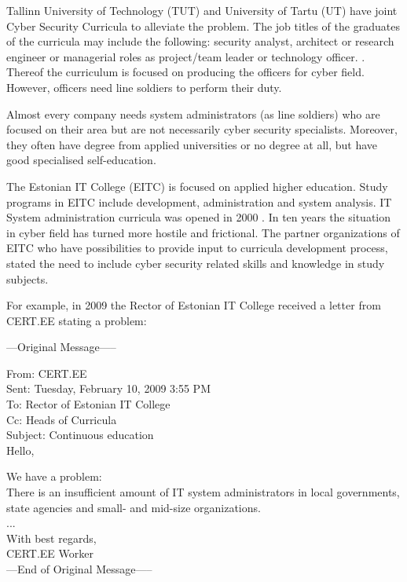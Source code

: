 Tallinn University of Technology (\gls{TUT}) and University of Tartu (\gls{UT}) have joint Cyber Security Curricula to alleviate the problem. The job titles of the graduates of the curricula may include the following: security analyst, architect or research engineer or managerial roles as project/team leader or technology officer. \citep{TUT_UT_curriculum}. Thereof the curriculum is focused on producing the officers for cyber field. 
However, officers need line soldiers to perform their duty.

Almost every company needs system administrators (as line soldiers) who are focused on their area but are not necessarily cyber security specialists. Moreover, they often have degree from applied universities or no degree at all, but have good specialised self-education.

The Estonian IT College (\gls{EITC}) is focused on applied higher education. Study programs in \gls{EITC} include development, administration and system analysis. IT System administration curricula was opened in 2000 \citep{website:EITC_history}. In ten years the situation in cyber field has turned more hostile and frictional. The partner organizations of \gls{EITC} who have possibilities to provide input to curricula development process, stated the need to include cyber security related skills and knowledge in study subjects.

For example, in 2009 the Rector of Estonian IT College received a letter from \gls{CERT.EE} stating a problem:\par

{
\begin{spacing}{1} 
\scriptsize
---Original Message-----

From: CERT.EE\\
Sent: Tuesday, February 10, 2009 3:55 PM\\
To: Rector of Estonian IT College\\
Cc: Heads of Curricula \\
Subject: Continuous education\\
Hello,

We have a problem:\\
There is an insufficient amount of IT system administrators in local governments, state agencies and small- and mid-size organizations.\\
...\\
With best regards,\\
CERT.EE Worker\\
---End of Original Message-----
\end{spacing}
}

